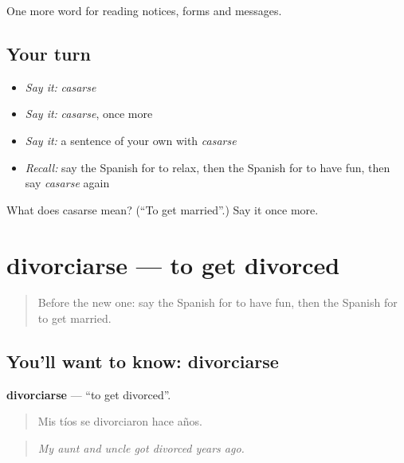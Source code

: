 \begin{grammarlens}[title={What you've built}]
One more word for reading notices, forms and messages.
\end{grammarlens}

\subsection*{Your turn}
\begin{itemize}
\raggedright
  \item \emph{Say it:} \emph{casarse}
  \item \emph{Say it:} \emph{casarse}, once more
  \item \emph{Say it:} a sentence of your own with \emph{casarse}
  \item \emph{Recall:} say the Spanish for to relax, then the Spanish for to have fun, then say \emph{casarse} again
\end{itemize}

\begin{tcolorbox}[breakable,colback=teal!4,colframe=teal!35!black,title={Before you move on}]
What does casarse mean? (\textquotedblleft{}To get married\textquotedblright{}.) Say it once more.
\end{tcolorbox}
\section[divorciarse]{divorciarse — to get divorced}

\label{lesson:ES-C488-divorciarse}



\begin{quote}
Before the new one: say the Spanish for to have fun, then the Spanish for to get married.
\end{quote}

\subsection*{You'll want to know: divorciarse}
\textbf{divorciarse} — \textquotedblleft{}to get divorced\textquotedblright{}.

\begin{quote}
Mis tíos se divorciaron hace años.
\end{quote}

\begin{quote}
\emph{My aunt and uncle got divorced years ago.}
\end{quote}

